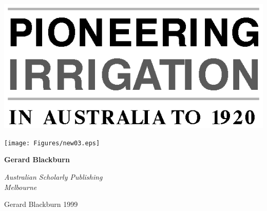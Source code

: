 \documentclass[11pt,b5paper,titlepage]{book}
\newcommand{\clearemptydoublepage}{\newpage{\pagestyle{empty}\cleardoublepage}}
\begin{document}
\frontmatter

\begin{titlepage}
\pagestyle{empty}

\begin{center}

\vspace*{60mm}


\includegraphics{Figures/fixedtitle.eps}

\end{center}
\clearemptydoublepage

\begin{center}
\vspace*{30mm}

\texttt{[image: Figures/new03.eps]}

\vspace{30mm}
{\bfseries\sffamily\huge Gerard Blackburn}

\vspace*{\fill}
{\sffamily\slshape\Large Australian Scholarly Publishing\\Melbourne}
\end{center}
\newpage


\begin{raggedright}

\vspace*{15ex}

 Gerard Blackburn 1999


\end{raggedright}
\end{titlepage}
\end{document}
